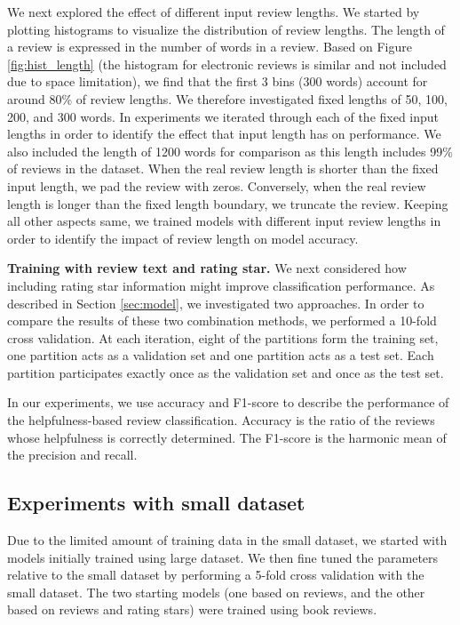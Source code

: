 \documentclass[conference,compsoc]{IEEEtran}
\begin{document}
We next explored the effect of different input review lengths. We started by plotting histograms to visualize the distribution of review lengths. The length of a review is expressed in the number of words in a review. Based on Figure \ref{fig:hist_length} (the histogram for electronic reviews is similar and not included due to space limitation), we find that the first 3 bins (300 words) account for around 80\% of review lengths. We therefore investigated fixed lengths of 50, 100, 200, and 300 words. In experiments we iterated through each of the fixed input lengths in order to identify the effect that input length has on performance. We also included the length of 1200 words for comparison as this length includes 99\% of reviews in the dataset. When the real review length is shorter than the fixed input length, we pad the review with zeros. Conversely, when the real review length is longer than the fixed length boundary, we truncate the review. Keeping all other aspects same, we trained models with different input review lengths in order to identify the impact of review length on model accuracy.

\textbf{Training with review text and rating star.} We next considered how including rating star information might improve classification performance. As described in Section \ref{sec:model}, we investigated two approaches. In order to compare the results of these two combination methods, we performed a 10-fold cross validation. At each iteration, eight of the partitions form the training set, one partition acts as a validation set and one partition acts as a test set. Each partition participates exactly once as the validation set and once as the test set.

In our experiments, we use accuracy and F1-score to describe the performance of the helpfulness-based review classification. Accuracy is the ratio of the reviews whose helpfulness is correctly determined. The F1-score is the harmonic mean of the precision and recall.

\subsection{Experiments with small dataset}
Due to the limited amount of training data in the small dataset, we started with models initially trained using large dataset. We then fine tuned the parameters relative to the small dataset by performing a 5-fold cross validation with the small dataset. The two starting models (one based on reviews, and the other based on reviews and rating stars) were trained using book reviews.
\end{document}

